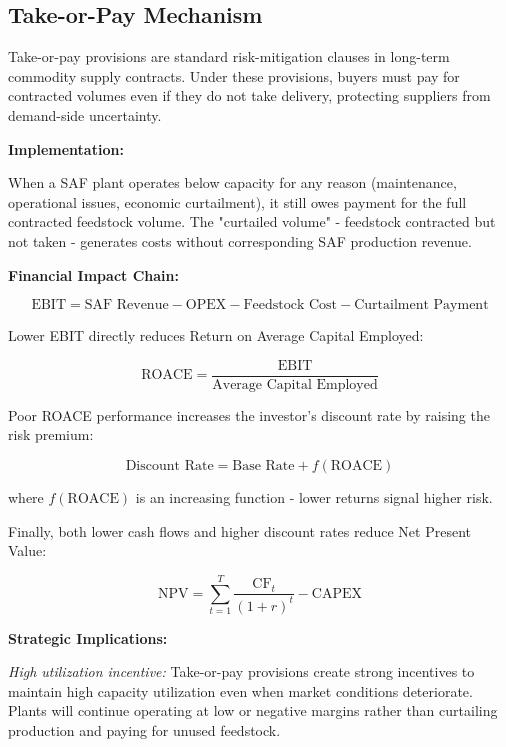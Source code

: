 \documentclass[10.5pt]{article}
\begin{document}
\subsection{Take-or-Pay Mechanism}

Take-or-pay provisions are standard risk-mitigation clauses in long-term commodity supply contracts. Under these provisions, buyers must pay for contracted volumes even if they do not take delivery, protecting suppliers from demand-side uncertainty.

\textbf{Implementation:}

When a SAF plant operates below capacity for any reason (maintenance, operational issues, economic curtailment), it still owes payment for the full contracted feedstock volume. The "curtailed volume" - feedstock contracted but not taken - generates costs without corresponding SAF production revenue.

\textbf{Financial Impact Chain:}

\begin{equation}
\text{EBIT} = \text{SAF Revenue} - \text{OPEX} - \text{Feedstock Cost} - \text{Curtailment Payment}
\end{equation}

Lower EBIT directly reduces Return on Average Capital Employed:

\begin{equation}
\text{ROACE} = \frac{\text{EBIT}}{\text{Average Capital Employed}}
\end{equation}

Poor ROACE performance increases the investor's discount rate by raising the risk premium:

\begin{equation}
\text{Discount Rate} = \text{Base Rate} + f(\text{ROACE})
\end{equation}

where $f(\text{ROACE})$ is an increasing function - lower returns signal higher risk.

Finally, both lower cash flows and higher discount rates reduce Net Present Value:

\begin{equation}
\text{NPV} = \sum_{t=1}^{T} \frac{\text{CF}_t}{(1 + r)^t} - \text{CAPEX}
\end{equation}

\textbf{Strategic Implications:}

\textit{High utilization incentive:} Take-or-pay provisions create strong incentives to maintain high capacity utilization even when market conditions deteriorate. Plants will continue operating at low or negative margins rather than curtailing production and paying for unused feedstock.
\end{document}
